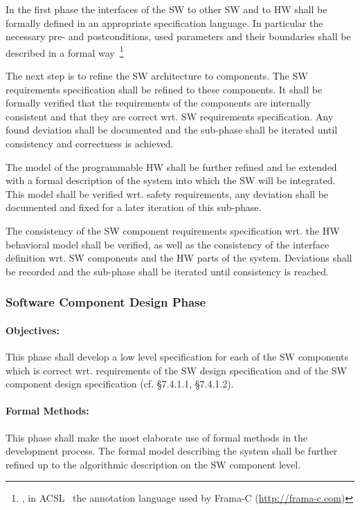 In the first phase the interfaces of the SW to other SW and to HW shall be
formally defined in an appropriate specification language. In particular the
necessary pre- and postconditions, used parameters and their boundaries shall be
described in a formal way~\footnote{\eg, in ACSL~\cite{baudin09acsl} the
  annotation language used by Frama-C (\url{http://frama-c.com})}

The next step is to refine the SW architecture to components. The SW
requirements specification shall be refined to these components. It shall be
formally verified that the requirements of the components are internally
consistent and that they are correct wrt. SW requirements specification. Any
found deviation shall be documented and the sub-phase shall be iterated until
consistency and correctness is achieved.

The model of the programmable HW shall be further refined and be extended with a
formal description of the system into which the SW will be integrated. This
model shall be verified wrt. safety requirements, any deviation shall be
documented and fixed for a later iteration of this sub-phase.

The consistency of the SW component requirements specification wrt. the HW
behavioral model shall be verified, as well as the consistency of the interface
definition wrt. SW components and the HW parts of the system. Deviations shall
be recorded and the sub-phase shall be iterated until consistency is reached.


\subsubsection{Software Component Design Phase}
\label{sec:softw-comp-design}

\paragraph{Objectives:}
\label{sec:sw-comp-objectives}
This phase shall develop a low level specification for each of the SW components
which is correct wrt. requirements of the SW design specification and of the SW
component design specification (cf. §7.4.1.1, §7.4.1.2).

\paragraph{Formal Methods:}
\label{sec:sw-comp-formal-methods}
This phase shall make the most elaborate use of formal methods in the
development process. The formal model describing the system shall be further
refined up to the algorithmic description on the SW component level.

